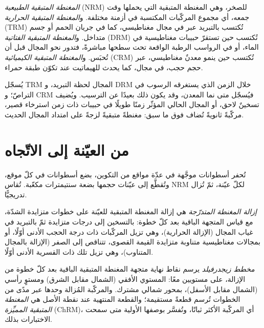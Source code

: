 \begin{definition}\label{def:b3:palaeomagnetism:nrm}
\emph{المغنطة المتبقية الطبيعية}
(NRM) للصخر، وهي المغنطة المتبقية التي يحملها وقت جمعه، أي مجموع
المركّبات المكتسبة في أزمنة مختلفة. و\emph{المغنطة المتبقية
الحرارية} (TRM) تُكتسب بالتبريد عبر
 في مجال مغناطيسي، كما في جريان الحمم أو
جسم متداخل. و\emph{المغنطة المتبقية الفتاتية}
(DRM) تُكتسب حين تستقرّ حبيبات مغناطيسية في الماء، أو في
الرواسب الرطبة الواقعة تحت سطحها مباشرةً، فتدور نحو المجال قبل أن
تُحبَس. و\emph{المغنطة المتبقية الكيميائية}
(CRM) تُكتسب حين ينمو معدنٌ مغناطيسي، عبر
حجم حجب، في مجال، كما يحدث للهيماتيت عند تكوّن طبقة حمراء.
\end{definition}

يُسجّل TRM المجال لحظة التبريد، و DRM خلال الزمن الذي
يستغرقه الرسوب في التراصّ؛ و CRM فيُسجّل متى نما المعدن، وقد يكون ذلك بعيدًا
عن الترسيب. ويُضيف تسخينٌ لاحق، أو المجال الحالي المؤثّر زمنًا طويلًا
في حبيبات ذات زمن استرخاء قصير، مركّبةً ثانويةً تُضاف فوق ما سبق:
مغنطةً متبقيةً لزجةً على امتداد المجال الحديث.

\section{من العيّنة إلى الاتّجاه}

تُحفر أسطوانات موجَّهة في عدّة مواقع من التكوين، بضع أسطوانات في كلّ
موقع، وتُقطَّع إلى عيّنات حجمها بضعة سنتيمترات مكعّبة. تُقاس NRM لكلّ عيّنة،
ثمّ تُزال تدريجيًّا.

\begin{definition}\label{def:b3:palaeomagnetism:demag}
\emph{إزالة المغنطة المتدرّجة} هي إزالة
المغنطة المتبقية للعيّنة على خطوات متزايدة الشدّة، مع قياس المتجهة الباقية بعد
كلّ خطوة: بالتسخين إلى درجات متزايدة ثمّ بالتبريد
في غياب المجال (الإزالة الحرارية)، وهي تزيل المركّبات ذات درجة الحجب الأدنى أوّلًا،
أو بمجالات مغناطيسية متناوبة متزايدة القيمة القصوى،
تتناقص إلى الصفر (الإزالة بالمجال المتناوب)، وهي تزيل
تلك ذات القسرية الأدنى أوّلًا.
\end{definition}

\begin{definition}\label{def:b3:palaeomagnetism:zijderveld}
\emph{مخطط زيجدرفيلد} يرسم نقاط نهاية
متجهة المغنطة المتبقية الباقية بعد كلّ خطوة من الإزالة، على مستويين معًا:
المستوي الأفقي (الشمال مقابل الشرق) ومستوٍ رأسي (الشمال مقابل الأسفل)،
بمحور شمالي مشترك. والمركّبة المُزالة وحدها عبر مدًى من
الخطوات تُرسم قطعةً مستقيمة؛ والقطعة المنتهية عند نقطة الأصل هي
\emph{المغنطة المتبقية المميِّزة}
(ChRM)، أي المركّبة الأكثر ثباتًا، وتُفسَّر بوصفها الأولية
متى سمحت الاختبارات بذلك.
\end{definition}

